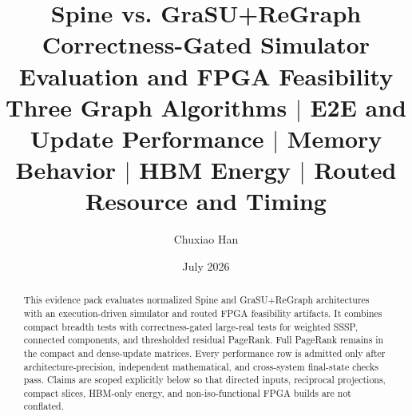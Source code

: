 \documentclass[10pt]{article}
\title{\textbf{Spine vs. GraSU+ReGraph}\\
  \large Correctness-Gated Simulator Evaluation and FPGA Feasibility\\[4pt]
  \normalsize Three Graph Algorithms $\mid$ E2E and Update Performance
  $\mid$ Memory Behavior $\mid$ HBM Energy $\mid$ Routed Resource and Timing}
\author{Chuxiao Han}
\date{July 2026}
\begin{document}
\maketitle

\begin{abstract}
This evidence pack evaluates normalized Spine and GraSU+ReGraph architectures
with an execution-driven simulator and routed FPGA feasibility artifacts.  It
combines compact breadth tests with correctness-gated large-real tests for
weighted SSSP, connected components, and thresholded residual PageRank.  Full
PageRank remains in the compact and dense-update matrices.  Every performance
row is admitted only after architecture-precision, independent mathematical,
and cross-system final-state checks pass.  Claims are scoped explicitly below
so that directed inputs, reciprocal projections, compact slices, HBM-only
energy, and non-iso-functional FPGA builds are not conflated.
\end{abstract}
\end{document}
